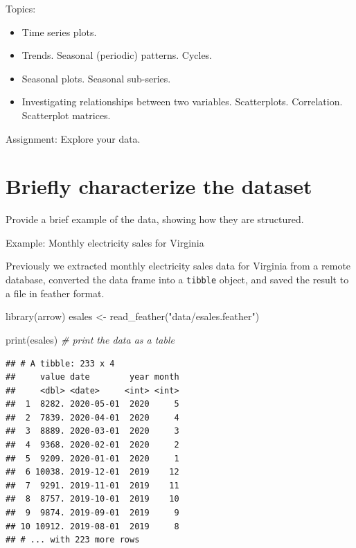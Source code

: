 \documentclass[
]{book}
\newenvironment{Shaded}{\begin{snugshade}}{\end{snugshade}}
\newcommand{\CommentTok}[1]{\textcolor[rgb]{0.56,0.35,0.01}{\textit{#1}}}
\newcommand{\FunctionTok}[1]{\textcolor[rgb]{0.00,0.00,0.00}{#1}}
\newcommand{\NormalTok}[1]{#1}
\newcommand{\OtherTok}[1]{\textcolor[rgb]{0.56,0.35,0.01}{#1}}
\newcommand{\StringTok}[1]{\textcolor[rgb]{0.31,0.60,0.02}{#1}}
\providecommand{\tightlist}{%
  \setlength{\itemsep}{0pt}\setlength{\parskip}{0pt}}
\begin{document}
Topics:

\begin{itemize}
\tightlist
\item
  Time series plots.
\item
  Trends. Seasonal (periodic) patterns. Cycles.
\item
  Seasonal plots. Seasonal sub-series.
\item
  Investigating relationships between two variables. Scatterplots. Correlation. Scatterplot matrices.
\end{itemize}

Assignment: Explore your data.

\hypertarget{briefly-characterize-the-dataset}{%
\section{Briefly characterize the dataset}\label{briefly-characterize-the-dataset}}

Provide a brief example of the data, showing how they are structured.

Example: Monthly electricity sales for Virginia

Previously we extracted monthly electricity sales data for Virginia from a remote database, converted the data frame into a \texttt{tibble} object, and saved the result to a file in feather format.

\begin{Shaded}
\begin{Highlighting}[]
\FunctionTok{library}\NormalTok{(arrow)}
\NormalTok{esales }\OtherTok{\textless{}{-}} \FunctionTok{read\_feather}\NormalTok{(}\StringTok{"data/esales.feather"}\NormalTok{)}
\end{Highlighting}
\end{Shaded}

\begin{Shaded}
\begin{Highlighting}[]
\FunctionTok{print}\NormalTok{(esales)    }\CommentTok{\# print the data as a table}
\end{Highlighting}
\end{Shaded}

\begin{verbatim}
## # A tibble: 233 x 4
##     value date        year month
##     <dbl> <date>     <int> <int>
##  1  8282. 2020-05-01  2020     5
##  2  7839. 2020-04-01  2020     4
##  3  8889. 2020-03-01  2020     3
##  4  9368. 2020-02-01  2020     2
##  5  9209. 2020-01-01  2020     1
##  6 10038. 2019-12-01  2019    12
##  7  9291. 2019-11-01  2019    11
##  8  8757. 2019-10-01  2019    10
##  9  9874. 2019-09-01  2019     9
## 10 10912. 2019-08-01  2019     8
## # ... with 223 more rows
\end{verbatim}
\end{document}
